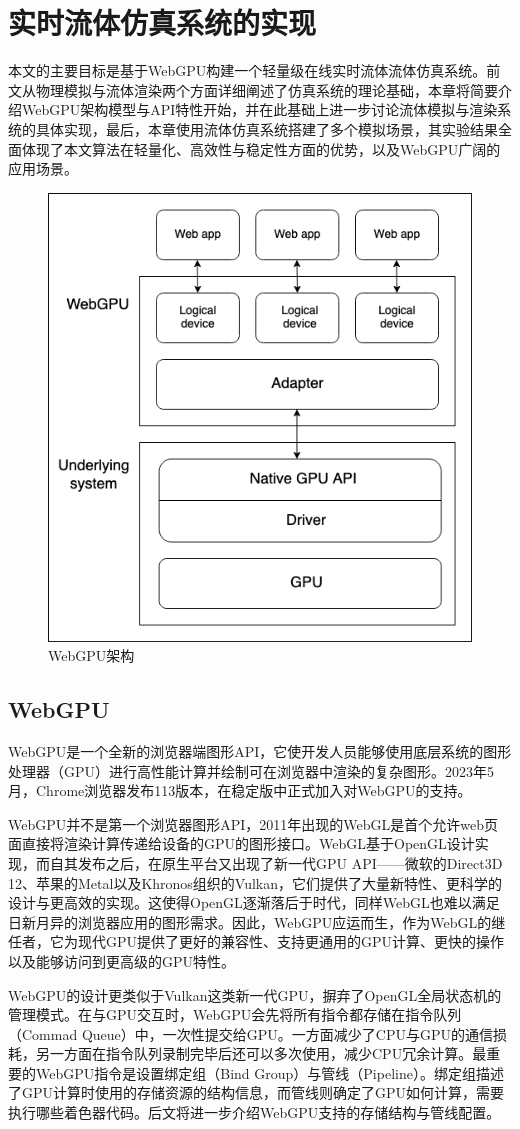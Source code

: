 \section{实时流体仿真系统的实现}
    本文的主要目标是基于WebGPU构建一个轻量级在线实时流体流体仿真系统。前文从物理模拟与流体渲染两个方面详细阐述了仿真系统的理论基础，本章将简要介绍WebGPU架构模型与API特性开始，并在此基础上进一步讨论流体模拟与渲染系统的具体实现，最后，本章使用流体仿真系统搭建了多个模拟场景，其实验结果全面体现了本文算法在轻量化、高效性与稳定性方面的优势，以及WebGPU广阔的应用场景。

    \begin{figure}[htbp]
    	\centering
    	\includegraphics[width=.5\textwidth]{figures/webgpu/architecture.png}
    	\caption{WebGPU架构}
    \end{figure}

\subsection{WebGPU}
    WebGPU是一个全新的浏览器端图形API，它使开发人员能够使用底层系统的图形处理器（GPU）进行高性能计算并绘制可在浏览器中渲染的复杂图形。2023年5月，Chrome浏览器发布113版本，在稳定版中正式加入对WebGPU的支持。

    WebGPU并不是第一个浏览器图形API，2011年出现的WebGL是首个允许web页面直接将渲染计算传递给设备的GPU的图形接口。WebGL基于OpenGL设计实现，而自其发布之后，在原生平台又出现了新一代GPU API——微软的Direct3D 12、苹果的Metal以及Khronos组织的Vulkan，它们提供了大量新特性、更科学的设计与更高效的实现。这使得OpenGL逐渐落后于时代，同样WebGL也难以满足日新月异的浏览器应用的图形需求。因此，WebGPU应运而生，作为WebGL的继任者，它为现代GPU提供了更好的兼容性、支持更通用的GPU计算、更快的操作以及能够访问到更高级的GPU特性。
    
    WebGPU的设计更类似于Vulkan这类新一代GPU，摒弃了OpenGL全局状态机的管理模式。在与GPU交互时，WebGPU会先将所有指令都存储在指令队列（Commad Queue）中，一次性提交给GPU。一方面减少了CPU与GPU的通信损耗，另一方面在指令队列录制完毕后还可以多次使用，减少CPU冗余计算。最重要的WebGPU指令是设置绑定组（Bind Group）与管线（Pipeline）。绑定组描述了GPU计算时使用的存储资源的结构信息，而管线则确定了GPU如何计算，需要执行哪些着色器代码。后文将进一步介绍WebGPU支持的存储结构与管线配置。

